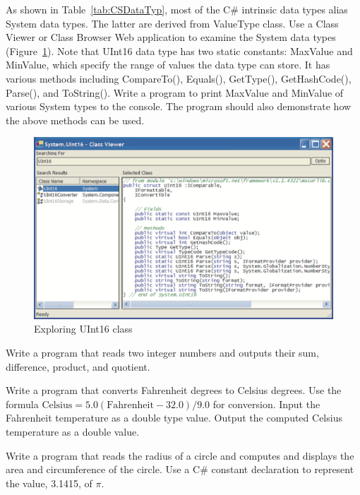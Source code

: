 {\progprojectsfont

\begin{list}{P \thechapter.\theenumi}%
{ \itemsep 0.05in \parskip 0in \parsep 0in}

\item As shown in Table~\ref{tab:CSDataTyp}, most of the C\#
intrinsic data types alias System data types. The latter are
derived from ValueType class. Use a Class Viewer or Class Browser
Web application to examine the System data types
(Figure~\ref{fig:UInt16Class}). Note that UInt16 data type has two
static constants: MaxValue and MinValue, which specify the range
of values the data type can store. It has various methods
including CompareTo(), Equals(), GetType(), GetHashCode(),
Parse(), and ToString(). Write a program to print MaxValue and
MinValue of various System types to the console. The program
should also demonstrate how the above methods can be used.

\begin{figure}
\centering
\includegraphics[scale=0.45]{./CSharpBasics/Illus/UInt16Class}
\caption{Exploring UInt16 class} \label{fig:UInt16Class}
\end{figure}


\item Write a program that reads two integer numbers and outputs
their sum, difference, product, and quotient.

\item Write a program that converts Fahrenheit degrees to Celsius
degrees. Use the formula $\mbox{Celsius} = 5.0 (\mbox{Fahrenheit}
- 32.0) / 9.0$ for conversion. Input the Fahrenheit temperature as
a double type value. Output the computed Celsius temperature as a
double value.

\item Write a program that reads the radius of a circle and
computes and displays the area and circumference of the circle.
Use a C\# constant declaration to represent the value, 3.1415, of
$\pi$.


\end{list}}
